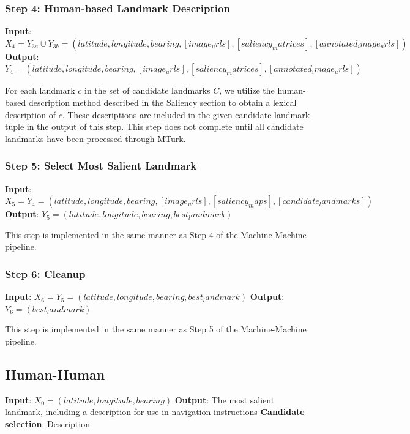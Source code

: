 \subsubsection*{Step 4: Human-based Landmark Description}

\textbf{Input}: $X_4 = Y_{3a} \cup Y_{3b} = (latitude, longitude, bearing, [image_urls], [saliency_matrices], [annotated_image_urls])$ 
\textbf{Output}: $Y_4 = (latitude, longitude, bearing, [image_urls], [saliency_matrices], [annotated_image_urls])$ 

For each landmark $c$ in the set of candidate landmarks $C$, we utilize the human-based description method described in the Saliency section to obtain a lexical description of $c$. These descriptions are included in the given candidate landmark tuple in the output of this step. This step does not complete until all candidate landmarks have been processed through MTurk.

\subsubsection*{Step 5: Select Most Salient Landmark}

\textbf{Input}: $X_5 = Y_4 = (latitude, longitude, bearing,  [image_urls], [saliency_maps], [candidate_landmarks] )$
\textbf{Output}: $Y_5 = (latitude, longitude, bearing, best_landmark)$
 
This step is implemented in the same manner as Step 4 of the Machine-Machine pipeline.

\subsubsection*{Step 6: Cleanup}

\textbf{Input}: $X_6 = Y_5 = (latitude, longitude, bearing, best_landmark)$
\textbf{Output}: $Y_6 = (best_landmark)$

This step is implemented in the same manner as Step 5 of the Machine-Machine pipeline.

\subsection{Human-Human}
\textbf{Input}: $X_0 = (latitude, longitude, bearing)$
\textbf{Output}: The most salient landmark, including a description for use in navigation instructions
\textbf{Candidate selection}: Description


